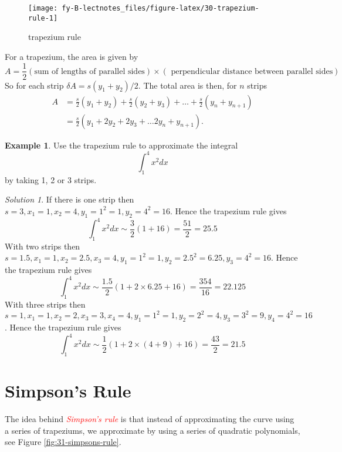 \documentclass[
  11pt,
  oneside]{book}
\newcommand{\slide}{}
\theoremstyle{definition}
\theoremstyle{definition}
\newtheorem{example}{Example}[chapter]
\theoremstyle{definition}
\theoremstyle{definition}
\theoremstyle{remark}
\newtheorem*{solution}{Solution}
\begin{document}
\begin{figure}

{\centering \texttt{[image: fy-B-lectnotes\_files/figure-latex/30-trapezium-rule-1]} 

}

\caption{trapezium rule}\label{fig:30-trapezium-rule}
\end{figure}

For a trapezium, the area is given by
\[
A =\frac12(\text{sum of lengths of parallel sides}) \times(\text{ perpendicular distance between parallel sides})
\]
So for each strip \(\delta A =s(y_1+y_2)/2\). The total area is then, for \(n\) strips
\begin{align*}
A& = \frac s2(y_1+y_2) + \frac s2(y_2+y_3) + \ldots + \frac s2(y_{n}+y_{n+1})\\
&= \frac s2\left(y_1+2y_2+2y_3+\ldots 2y_{n}+y_{n+1}\right).
\end{align*}

\slide

\begin{example}
Use the trapezium rule to approximate the integral
\[
\int_1^4x^2dx
\]
by taking 1, 2 or 3 strips.
\end{example}

\begin{solution}
If there is one strip then \(s=3, x_1=1, x_2 = 4, y_1=1^2=1, y_2=4^2=16\). Hence the trapezium rule gives
\[
\int_1^4 x^2 dx \sim \frac32\left(1+16\right) = \frac{51}{2} = 25.5
\]
With two strips then \(s=1.5,x_1=1, x_2=2.5, x_3=4, y_1=1^2=1, y_2=2.5^2=6.25, y_3=4^2=16\). Hence the trapezium rule gives
\[
\int_1^4 x^2 dx \sim \frac{1.5}2\left(1+2\times6.25+16\right) = \frac{354}{16} = 22.125
\]
With three strips then \(s=1,x_1=1, x_2=2, x_3 = 3, x_4=4, y_1=1^2=1, y_2=2^2=4, y_3=3^2=9, y_4=4^2=16\). Hence the trapezium rule gives
\[
\int_1^4 x^2 dx \sim \frac{1}2\left(1+2\times(4+9)+16\right) = \frac{43}{2} = 21.5
\]
\end{solution}

\section{Simpson's Rule}\label{simpsons-rule}

The idea behind \textcolor{red}{\em Simpson's rule} is that instead of approximating the curve using a series of trapeziums, we approximate by using a series of quadratic polynomials, see Figure \ref{fig:31-simpsons-rule}.
\end{document}
